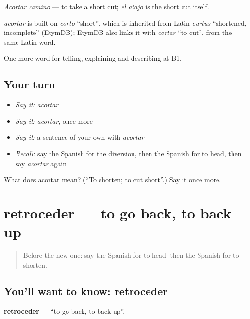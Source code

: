 \emph{Acortar camino} — to take a short cut; \emph{el atajo} is the short cut itself.

\begin{cousinweb}
\emph{acortar} is built on \emph{corto} \textquotedblleft{}short\textquotedblright{}, which is inherited from Latin \emph{curtus} \textquotedblleft{}shortened, incomplete\textquotedblright{} (EtymDB); EtymDB also links it with \emph{cortar} \textquotedblleft{}to cut\textquotedblright{}, from the same Latin word.
\end{cousinweb}

\begin{grammarlens}[title={What you've built}]
One more word for telling, explaining and describing at B1.
\end{grammarlens}

\subsection*{Your turn}
\begin{itemize}
\raggedright
  \item \emph{Say it:} \emph{acortar}
  \item \emph{Say it:} \emph{acortar}, once more
  \item \emph{Say it:} a sentence of your own with \emph{acortar}
  \item \emph{Recall:} say the Spanish for the diversion, then the Spanish for to head, then say \emph{acortar} again
\end{itemize}

\begin{tcolorbox}[breakable,colback=teal!4,colframe=teal!35!black,title={Before you move on}]
What does acortar mean? (\textquotedblleft{}To shorten; to cut short\textquotedblright{}.) Say it once more.
\end{tcolorbox}
\section[retroceder]{retroceder — to go back, to back up}

\label{lesson:ES-C673-retroceder}



\begin{quote}
Before the new one: say the Spanish for to head, then the Spanish for to shorten.
\end{quote}

\subsection*{You'll want to know: retroceder}
\textbf{retroceder} — \textquotedblleft{}to go back, to back up\textquotedblright{}.

